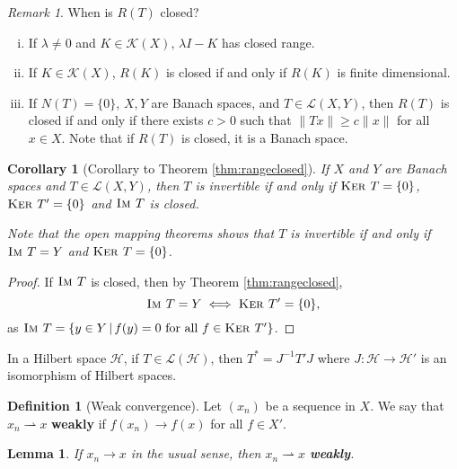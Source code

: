 \documentclass[10pt, oneside, reqno]{amsart}
\theoremstyle{plain}%
\newtheorem{lem}[thm]{Lemma}
\newtheorem*{cor}{Corollary}
\numberwithin{equation}{section}
\theoremstyle{definition}
\newtheorem{defn}[thm]{Definition}
\theoremstyle{remark}
\newtheorem*{rem}{Remark}
\newcommand{\given}{ \, | \,}
\newcommand{\im}{\textsc{Im\ }}
\renewcommand{\ker}{\textsc{Ker\ }}
\begin{document}
\begin{rem}When is $R(T)$ closed?
	
	\begin{enumerate}[(i)]
		\item If $\lambda \neq 0$ and $K \in \mathcal K(X)$, $\lambda I - K$ has closed range.
		\item If $K \in \mathcal K(X)$, $R(K)$ is closed if and only if $R(K)$ is finite dimensional.  
		\item If $N(T) = \{ 0 \}$, $X, Y$ are Banach spaces, and $T \in \mathcal L(X, Y)$, then $R(T)$ is closed if and only if there exists $c > 0$ such that $\| Tx \| \geq c \| x \|$ for all $x \in X$.  Note that if $R(T)$ is closed, it is a Banach space.  
	\end{enumerate}
	
\end{rem}



\begin{cor}[Corollary to Theorem \ref{thm:rangeclosed}]
	If $X$ and $Y$ are Banach spaces and $T \in \mathcal L(X, Y)$, then $T$ is invertible if and only if $\ker T = \{ 0 \}$, $\ker T' = \{ 0 \}$ and $\im T$ is closed. 
	
	Note that the open mapping theorems shows that $T$ is invertible if and only if $\im T = Y$ and $\ker T = \{ 0 \}$. 
\end{cor}

\begin{proof}
	If $\im T$ is closed, then by Theorem \ref{thm:rangeclosed}, \[
		\im T = Y \iff \ker T' = \{ 0 \},
	\] as $\im T = \{ y \in Y \given f(y) = 0 \text{ for all } f \in \ker T' \}$.  
\end{proof}  

In a Hilbert space $\mathcal H$, if $T \in \mathcal L(\mathcal H)$, then $T^* = J^{-1} T' J$ where $J: \mathcal H \rightarrow \mathcal H'$ is an isomorphism of Hilbert spaces.  

\begin{defn}[Weak convergence]
	Let $(x_n)$ be a sequence in $X$.  We say that $x_n \rightharpoonup x$ \textbf{weakly} if $f(x_n) \rightarrow f(x)$ for all $f \in X'$.
\end{defn}

\begin{lem}
	If $x_n \rightarrow x$ in the usual sense, then $x_n \rightharpoonup x$ \textbf{weakly}. 
\end{lem}
\end{document}
